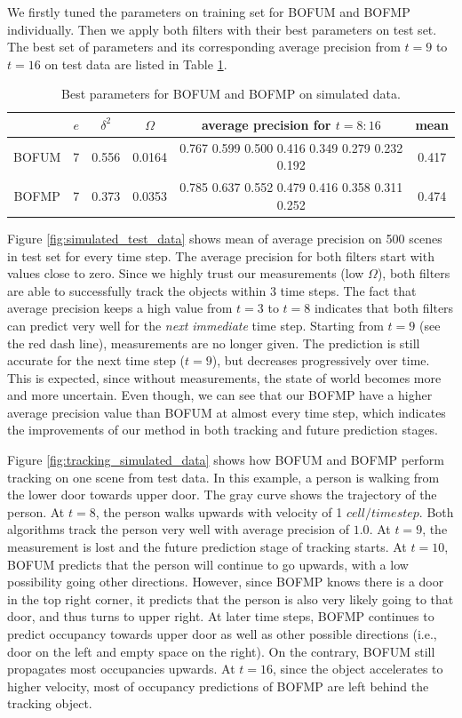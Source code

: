  We firstly tuned the parameters on training set for BOFUM and BOFMP individually. Then we apply both filters with their best parameters on test set. The best set of parameters and its corresponding average precision from \( t=9 \) to \( t=16 \) on test data are listed in Table \ref{table:best_param_simulated}. 

\begin{table}[H]
\centering  
\begin{tabularx}{\textwidth}{c|c|c|c|c|c}
    \hline
    & $ e $ & $ \delta^2 $ & $ \Omega $ & average precision for $t=8:16 $ & mean\\ \hline
    BOFUM & 7 & 0.556 & 0.0164 &  0.767  0.599  0.500    0.416  0.349  0.279  0.232  0.192 & 0.417 \\
    BOFMP & 7 & 0.373 & 0.0353 & 0.785  0.637  0.552  0.479  0.416  0.358  0.311  0.252 & 0.474 \\
   \hline
  \end{tabularx}
\caption{Best parameters for BOFUM and BOFMP on simulated data.}
\label{table:best_param_simulated}
\end{table}

Figure \ref{fig:simulated_test_data} shows mean of average precision on 500 scenes in test set for every time step. The average precision for both filters start with values close to zero. Since we highly trust our measurements (low $\Omega$), both filters are able to successfully track the objects within 3 time steps. The fact that average precision keeps a high value from $t=3$ to $t=8$ indicates that both filters can predict very well for the \textit{next immediate} time step. Starting from $t=9$ (see the red dash line), measurements are no longer given. The prediction is still accurate for the next time step ($t=9$), but decreases progressively over time.  This is expected, since without measurements, the state of world becomes more and more uncertain. Even though, we can see that our BOFMP have a higher average precision value than BOFUM at almost every time step, which indicates the improvements of our method in both tracking and future prediction stages.

Figure \ref{fig:tracking_simulated_data} shows how BOFUM and BOFMP perform tracking on one scene from test data. In this example, a person is walking from the lower door towards upper door. The gray curve shows the trajectory of the person. At $t=8$, the person walks upwards with velocity of 1 $cell/timestep$. Both algorithms track the person very well with average precision of $1.0$. At $t=9$, the measurement is lost and the future prediction stage of tracking starts. At $t=10$, BOFUM predicts that the person will continue to go upwards, with a low possibility going other directions. However, since BOFMP knows there is a door in the top right corner, it predicts that the person is also very likely going to that door, and thus turns to upper right. At later time steps, BOFMP continues to predict occupancy towards upper door as well as other possible directions (i.e., door on the left and empty space on the right). On the contrary, BOFUM still propagates most occupancies upwards. At $t=16$, since the object accelerates to higher velocity, most of occupancy predictions of BOFMP are left behind the tracking object.

